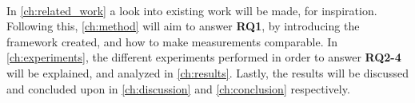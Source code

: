 \paragraph*{}
In \cref*{ch:related_work} a look into existing work will be made, for inspiration. Following this, \cref*{ch:method} will aim to answer \textbf{RQ1}, by introducing the framework created, and how to make measurements comparable. In \cref*{ch:experiments}, the different experiments performed in order to answer \textbf{RQ2-4} will be explained, and analyzed in \cref*{ch:results}. Lastly, the results will be discussed and concluded upon in \cref*{ch:discussion} and \cref*{ch:conclusion} respectively.








